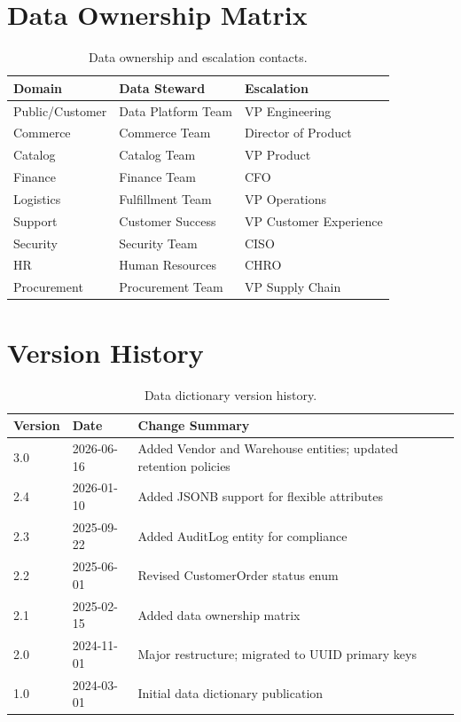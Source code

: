 \documentclass[
    language=english,
    doctype=data-dictionary,
    institution=none,
]{../../omnilatex}
\begin{document}
\section{Data Ownership Matrix}

\begin{table}[h]
    \centering
    \begin{tabular}{lll}
        \toprule
        \textbf{Domain} & \textbf{Data Steward} & \textbf{Escalation} \\
        \midrule
        Public/Customer & Data Platform Team & VP Engineering \\
        Commerce & Commerce Team & Director of Product \\
        Catalog & Catalog Team & VP Product \\
        Finance & Finance Team & CFO \\
        Logistics & Fulfillment Team & VP Operations \\
        Support & Customer Success & VP Customer Experience \\
        Security & Security Team & CISO \\
        HR & Human Resources & CHRO \\
        Procurement & Procurement Team & VP Supply Chain \\
        \bottomrule
    \end{tabular}
    \caption{Data ownership and escalation contacts.}
\end{table}

\section{Version History}

\begin{table}[h]
    \centering
    \begin{tabular}{lll}
        \toprule
        \textbf{Version} & \textbf{Date} & \textbf{Change Summary} \\
        \midrule
        3.0 & 2026-06-16 & Added Vendor and Warehouse entities; updated retention policies \\
        2.4 & 2026-01-10 & Added JSONB support for flexible attributes \\
        2.3 & 2025-09-22 & Added AuditLog entity for compliance \\
        2.2 & 2025-06-01 & Revised CustomerOrder status enum \\
        2.1 & 2025-02-15 & Added data ownership matrix \\
        2.0 & 2024-11-01 & Major restructure; migrated to UUID primary keys \\
        1.0 & 2024-03-01 & Initial data dictionary publication \\
        \bottomrule
    \end{tabular}
    \caption{Data dictionary version history.}
\end{table}
\end{document}
